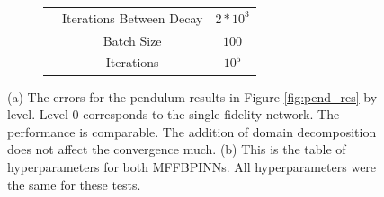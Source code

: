 \documentclass[12pt]{article}
\begin{document}
\begin{figure}[htpb]
\begin{subfigure}{0.59\textwidth}
\begin{center}
\begin{tabular}{|c|c|c|}
					& Iterations Between Decay & $2*10^3$ \\
					& Batch Size & $100$ \\
					& Iterations & $10^5$ \\
 	\hline
	\end{tabular}
	\end{center}
	\caption{}
     \label{subfig:b}
    \end{subfigure}
\caption{(a) The errors for the pendulum results in Figure \ref{fig:pend_res} by level. Level 0 corresponds to the single fidelity network. The performance is comparable. The addition of domain decomposition does not affect the convergence much. (b) This is the table of hyperparameters for both MFFBPINNs. All hyperparameters were the same for these tests.}
\end{figure}
\end{document}
